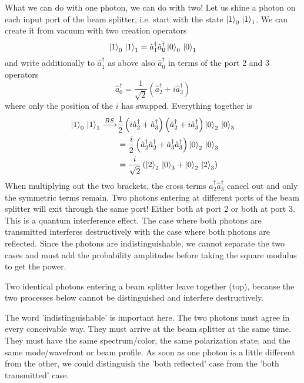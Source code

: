 What we can do with one photon, we can do with two! Let us shine a photon on each input port of the beam splitter, i.e. start with the state $\ket{1}_0 \, \ket{1}_1 $. We can create it from vacuum with two creation operators
\begin{equation}
    \ket{1}_0 \,  \ket{1}_1 = \hat{a}^\dagger_1 \hat{a}^\dagger_0 \ket{0}_0 \,  \ket{0}_1 
\end{equation}
and write additionally to $ \hat{a}^\dagger_1$ as above also  $\hat{a}^\dagger_0$ in terms of the port 2 and 3 operators 
\begin{equation}
    \hat{a}^\dagger_0 = \frac{1}{\sqrt{2}} \left(  \hat{a}^\dagger_2 + i \hat{a}^\dagger_3 \right)
\end{equation}
where only the position of the $i$ has swapped. Everything together is
\begin{align}
    \ket{1}_0 \,  \ket{1}_1  \xrightarrow{BS} & \frac{1}{2} 
    \left( i \hat{a}^\dagger_2 +  \hat{a}^\dagger_3\right) 
     \left( \hat{a}^\dagger_2 + i \hat{a}^\dagger_3\right) 
      \ket{0}_2 \,  \ket{0}_3 \\
      & = \frac{i}{2} 
      \left(  \hat{a}^\dagger_2  \hat{a}^\dagger_2 +  \hat{a}^\dagger_3 \hat{a}^\dagger_3\right) 
        \ket{0}_2 \,  \ket{0}_3 \\
        & = \frac{i}{\sqrt{2}} 
        \left(    \ket{2}_2 \,  \ket{0}_3 +  \ket{0}_2 \,  \ket{2}_3 \right) 
\end{align}
When multiplying out the two brackets, the cross terms $\hat{a}^\dagger_2  \hat{a}^\dagger_3$ cancel out and only the symmetric terms remain.  Two photons entering at different ports of the beam splitter will exit through the same port! Either both at port 2 or both at port 3. This is a quantum interference effect. The case where both photons are transmitted interferes destructively with the case where both photons are reflected. Since the photons are indistinguishable, we cannot separate the two cases and must add the probability amplitudes before taking the square modulus to get the power.

\begin{marginfigure}
    \caption{Two identical photons entering a beam splitter leave together (top), because the two processes below cannot be distinguished and interfere destructively.}
\end{marginfigure}


The word 'indistinguishable' is important here. The two photons must agree in every conceivable way. They must arrive at the beam splitter at the same time. They must have the same spectrum/color, the same polarization state, and the same mode/wavefront or beam profile. As soon as one photon is a little different from the other, we could distinguish the 'both reflected' case from the 'both transmitted' case.
 
